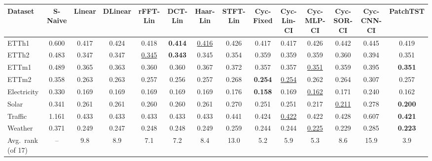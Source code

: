 \begin{tabular}{lccccccccccccc}
\toprule
Dataset & S-Naive & Linear & DLinear & rFFT-Lin & DCT-Lin & Haar-Lin & STFT-Lin & Cyc-Fixed & Cyc-Lin-CI & Cyc-MLP-CI & Cyc-SOR-CI & Cyc-CNN-CI & PatchTST \\
\midrule
ETTh1 & 0.600 & 0.417 & 0.424 & 0.418 & \textbf{0.414} & \underline{0.416} & 0.426 & 0.417 & 0.417 & 0.426 & 0.442 & 0.445 & 0.419 \\
ETTh2 & 0.483 & 0.347 & 0.347 & \underline{0.345} & \textbf{0.343} & 0.345 & 0.354 & 0.359 & 0.359 & 0.359 & 0.360 & 0.394 & 0.351 \\
ETTm1 & 0.489 & 0.365 & 0.363 & 0.360 & 0.360 & 0.367 & 0.372 & 0.357 & 0.357 & \underline{0.351} & 0.359 & 0.395 & \textbf{0.351} \\
ETTm2 & 0.358 & 0.263 & 0.263 & 0.257 & 0.256 & 0.257 & 0.268 & \textbf{0.254} & \underline{0.254} & 0.262 & 0.264 & 0.307 & 0.257 \\
Electricity & 0.330 & 0.169 & 0.169 & 0.169 & 0.169 & 0.169 & 0.176 & \textbf{0.158} & 0.169 & \underline{0.162} & 0.171 & 0.240 & 0.162 \\
Solar & 0.341 & 0.261 & 0.261 & 0.260 & 0.260 & 0.261 & 0.270 & 0.251 & 0.251 & 0.217 & \underline{0.211} & 0.278 & \textbf{0.200} \\
Traffic & 1.161 & 0.433 & 0.433 & 0.433 & 0.433 & 0.433 & 0.441 & 0.424 & \underline{0.422} & 0.422 & 0.428 & 0.607 & \textbf{0.421} \\
Weather & 0.371 & 0.249 & 0.247 & 0.248 & 0.248 & 0.249 & 0.259 & 0.244 & 0.244 & \underline{0.225} & 0.229 & 0.285 & \textbf{0.223} \\
\midrule
Avg.\ rank (of 17) & -- & 9.8 & 8.9 & 7.1 & 7.2 & 8.4 & 13.0 & 5.2 & 5.9 & 5.3 & 8.6 & 15.9 & 3.9 \\
\bottomrule
\end{tabular}